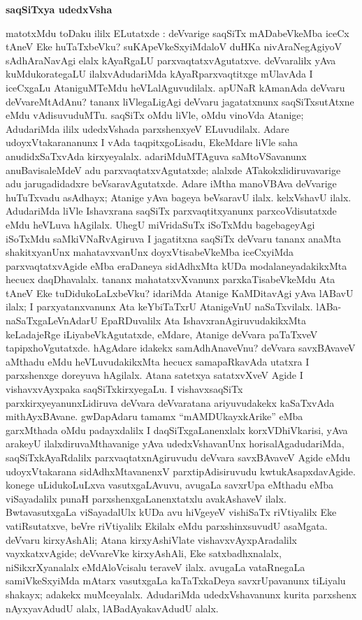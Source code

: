 \bigskip
\begin{center}
{\Large\bf saqSiTxya udedxVsha}
\end{center}

matotxMdu toDaku ililx ELutatxde : deVvarige saqSiTx mADabeVkeMba iceCx tAneV Eke huTaTxbeVku? suKApeVkeSxyiMdaloV duHKa nivAraNegAgiyoV sAdhAraNavAgi elalx kAyaRgaLU parxvaqtatxvAgutatxve. deVvaralilx yAva kuMdukorategaLU ilalxvAdudariMda kAyaRparxvaqtitxge mUlavAda I iceCxgaLu AtaniguMTeMdu heVLalAguvudilalx. apUNaR kAmanAda deVvaru deVvareMtAdAnu? tananx liVlegaLigAgi deVvaru jagatatxnunx saqSiTxsutAtxne eMdu vAdisuvuduMTu. saqSiTx oMdu liVle, oMdu vinoVda Atanige; AdudariMda ililx udedxVshada parxshenxyeV ELuvudilalx. Adare udoyxVtakarananunx I vAda taqpitxgoLisadu, EkeMdare liVle saha anudidxSaTxvAda kirxyeyalalx. adariMduMTAguva saMtoVSavanunx anuBavisaleMdeV adu parxvaqtatxvAgutatxde; alalxde ATakokxlidiruvavarige adu jarugadidadxre beVsaravAgutatxde. Adare iMtha manoVBAva deVvarige huTuTxvadu asAdhayx; Atanige yAva bageya beVsaravU ilalx. kelxVshavU ilalx. AdudariMda liVle Ishavxrana saqSiTx parxvaqtitxyanunx parxcoVdisutatxde eMdu heVLuva hAgilalx. UhegU miVridaSuTx iSoTxMdu bagebageyAgi iSoTxMdu saMkiVNaRvAgiruva I jagatitxna saqSiTx deVvaru tananx anaMta shakitxyanUnx mahatavxvanUnx doyxVtisabeVkeMba iceCxyiMda parxvaqtatxvAgide eMba eraDaneya sidAdhxMta kUDa modalaneyadakikxMta hecucx daqDhavalalx. tananx mahatatxvXvanunx parxkaTisabeVkeMdu Ata tAneV Eke tuDidukoLaLxbeVku? idariMda Atanige KaMDitavAgi yAva lABavU ilalx; I parxyatanxvanunx Ata keYbiTaTxrU AtanigeVnU naSaTxvilalx. lABa-naSaTxgaLeVnAdarU EpaRDuvalilx Ata IshavxranAgiruvudakikxMta keLadajeRge iLiyabeVkAgutatxde, eMdare, Atanige deVvara paTaTxveV tapipxhoVgutatxde. hAgAdare idakekx samAdhAnaveVnu? deVvara savxBAvaveV aMthadu eMdu heVLuvudakikxMta hecucx samapaRkavAda utatxra I parxshenxge doreyuva hAgilalx. Atana satetxya satatxvXveV Agide I vishavxvAyxpaka saqSiTxkirxyegaLu. I vishavxsaqSiTx parxkirxyeyanunxLidiruva deVvara deVvaratana ariyuvudakekx kaSaTxvAda mithAyxBAvane. gwDapAdaru tamamx ``mAMDUkayxkArike'' eMba garxMthada oMdu padayxdalilx I daqSiTxgaLanenxlalx korxVDhiVkarisi, yAva arakeyU ilalxdiruvaMthavanige yAva udedxVshavanUnx horisalAgadudariMda, saqSiTxkAyaRdalilx parxvaqtatxnAgiruvudu deVvara savxBAvaveV Agide eMdu udoyxVtakarana sidAdhxMtavanenxV parxtipAdisiruvudu kwtukAsapxdavAgide. konege uLidukoLuLxva vasutxgaLAvuvu, avugaLa savxrUpa eMthadu eMba viSayadalilx punaH parxshenxgaLanenxtatxlu avakAshaveV ilalx. BwtavasutxgaLa viSayadalUlx kUDa avu hiVgeyeV vishiSaTx riVtiyalilx Eke vatiRsutatxve, beVre riVtiyalilx Ekilalx eMdu parxshinxsuvudU asaMgata. deVvaru kirxyAshAli; Atana kirxyAshiVlate vishavxvAyxpAradalilx vayxkatxvAgide; deVvareVke kirxyAshAli, Eke satxbadhxnalalx, niSikxrXyanalalx eMdAloVcisalu teraveV ilalx. avugaLa vataRnegaLa samiVkeSxyiMda mAtarx vasutxgaLa kaTaTxkaDeya savxrUpavanunx tiLiyalu shakayx; adakekx muMceyalalx. AdudariMda udedxVshavanunx kurita parxshenx nAyxyavAdudU alalx, lABadAyakavAdudU alalx.

